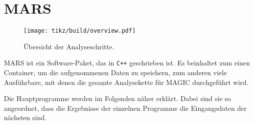\section{MARS}%
\label{sec:mars}

\begin{wrapfigure}[31]{r}{0.5\textwidth}
  \centering
  \texttt{[image: tikz/build/overview.pdf]}%
  \caption{Ü\-ber\-sicht der Ana\-lyse\-schrit\-te.}%
  \label{fig:uebersicht_analyse}
\end{wrapfigure}

MARS ist ein Software-Paket, das in \texttt{C++} geschrieben ist.
Es beinhaltet zum einen Container, um die aufgenommenen Daten zu speichern,
zum anderen viele Ausführbare,
mit denen die gesamte Analysekette für MAGIC durchgeführt wird.

Die Hauptprogramme werden im Folgenden näher erklärt.
Dabei sind sie so angeordnet, dass die Ergebnisse der einzelnen
Programme die Eingangsdaten der nächsten sind.











